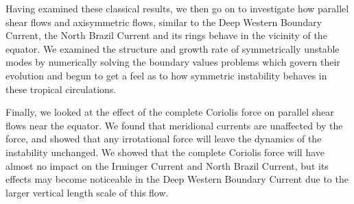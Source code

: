 Having examined these classical results, we then go on to investigate how parallel shear flows and axisymmetric flows, similar to the Deep Western Boundary Current, the North Brazil Current and its rings behave in the vicinity of the equator. We examined the structure and growth rate of symmetrically unstable modes by numerically solving the boundary values problems which govern their evolution and begun to get a feel as to how symmetric instability behaves in these tropical circulations.

Finally, we looked at the effect of the complete Coriolis force on parallel shear flows near the equator. We found that meridional currents are unaffected by the force, and showed that any irrotational force will leave the dynamics of the instability unchanged. We showed that the complete Coriolis force will have almost no impact on the Irminger Current and North Brazil Current, but its effects may become noticeable in the Deep Western Boundary Current due to the larger vertical length scale of this flow.
